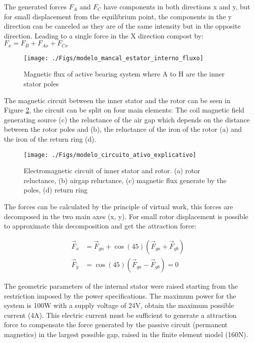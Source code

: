 \documentclass[10pt,fleqn,a4paper,twoside]{article}
\begin{document}
	The generated forces $F_A$ and $F_C$  have components in both directions x and y, but for small displacement from the equilibrium point, the components in the y direction can be canceled as they are of the same intensity but in the opposite direction. Leading to a single force in the X direction compost by: $F_x = F_B + F_{Ax} + F_{Cx}$
	
	\begin{figure}[ht]
		\centering
		\texttt{[image: ./Figs/modelo\_mancal\_estator\_interno\_fluxo]}
		\caption{Magnetic flux of active bearing system where A to H are the inner stator poles}
		\label{fig:modelo:mancal:estator:interno:fluxo}
	\end{figure}
	
	The magnetic circuit between the inner stator and the rotor can be seen in Figure \ref{fig:modelo:circuito:ativo:explicativo}, the circuit can be split on four main elements: The coil magnetic field generating source (c) the reluctance of the air gap which depends on the distance between the rotor poles and (b), the reluctance of the iron of the rotor (a) and the iron of the return ring (d).
	
	\begin{figure}[ht]
		\centering
		\texttt{[image: ./Figs/modelo\_circuito\_ativo\_explicativo]}
		\caption{Electromagnetic circuit of inner stator and rotor. (a) rotor reluctance, (b) airgap reluctance, (c) magnetic flux generate by the poles, (d) return ring}
		\label{fig:modelo:circuito:ativo:explicativo}
	\end{figure}
	
	
	The forces can be calculated by the principle of virtual work, this forces are decomposed in the two main axes (x, y). For small rotor displacement is possible to approximate this decomposition and get the attraction force: 
	
	\begin{align}
		\vec{F}_x &= \vec{F}_{gn} + \cos(45) (\vec{F}_{ga} + \vec{F}_{gb}) \label{eq:ativo:F:resultante:y} \\
		\vec{F}_y &=  \cos(45) (\vec{F}_{ga} - \vec{F}_{gb}) = 0 \label{eq:ativo:F:resultante:x}
	\end{align}
	
	The geometric parameters of the internal stator were raised starting from the restriction imposed by the power specifications. The maximum power for the system is 100W with a  supply voltage of 24V, obtain the maximum possible current  (4A). This electric current must be sufficient to generate a attraction force to compensate the force generated by the passive circuit (permanent magnetics) in the largest  possible gap, raised in the finite element model (160N).
	
\end{document}
